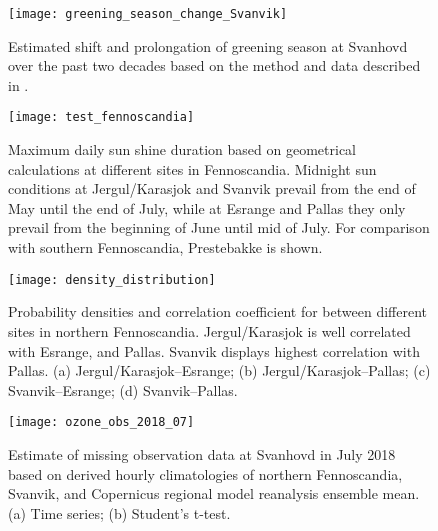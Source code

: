 \documentclass[bg, manuscript]{copernicus}
\begin{document}

\appendixfigures  %
\begin{figure}[t]
  \texttt{[image: greening\_season\_change\_Svanvik]}
  \caption{Estimated shift and prolongation of greening season at Svanhovd over the past two decades based on the method and data described in \citet{GMD:Falk2019}.}
  \label{fig:greening_season_change_Svanvik}
\end{figure}

\begin{figure}[t]
  \texttt{[image: test\_fennoscandia]}
  \caption{Maximum daily sun shine duration based on geometrical calculations at different sites in Fennoscandia. Midnight sun conditions at Jergul/Karasjok and Svanvik prevail from the end of May until the end of July, while at Esrange and Pallas they only prevail from the beginning of June until mid of July. For comparison with southern Fennoscandia, Prestebakke is shown.}
  \label{fig:sunlight_fennoscandia}
\end{figure}

\begin{figure}[t]
  \texttt{[image: density\_distribution]}
  \caption{Probability densities and correlation coefficient for \chem{[O_3]} between different sites in northern Fennoscandia. Jergul/Karasjok is well correlated with Esrange, and Pallas. Svanvik displays highest correlation with Pallas. (a) Jergul/Karasjok--Esrange; (b) Jergul/Karasjok--Pallas; (c) Svanvik--Esrange; (d) Svanvik--Pallas.}
  \label{fig:density_distribution}
\end{figure}

\begin{figure}[t]
  \texttt{[image: ozone\_obs\_2018\_07]}
  \caption{Estimate of missing observation \chem{[O_3]} data at Svanhovd in July 2018 based on derived hourly climatologies of northern Fennoscandia, Svanvik, and Copernicus regional model reanalysis ensemble mean. (a) Time series; (b) Student's t-test.}
  \label{fig:ozone_obs_2018_rrea}
\end{figure}

\appendixtables   %

\end{document}
